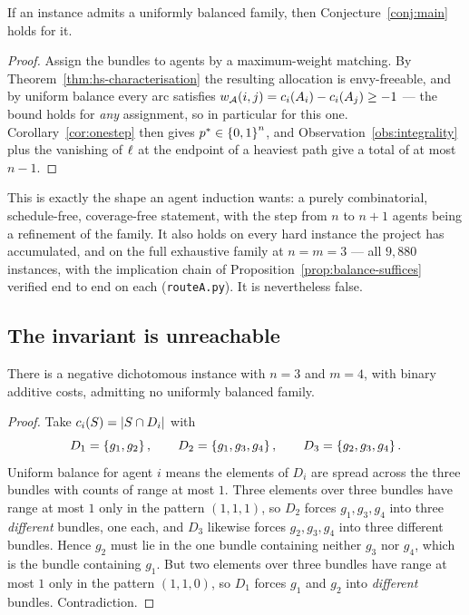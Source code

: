 \begin{proposition}
\label{prop:balance-suffices}
If an instance admits a uniformly balanced family, then
Conjecture~\ref{conj:main} holds for it.
\end{proposition}

\begin{proof}
Assign the bundles to agents by a maximum-weight matching. By
Theorem~\ref{thm:hs-characterisation} the resulting allocation is
envy-freeable, and by uniform balance every arc satisfies
$w_{\mathcal{A}}(i,j) = c_i(A_{i}) - c_i(A_{j}) \ge -1$
--- the bound holds for \emph{any} assignment, so in particular for this one.
Corollary~\ref{cor:onestep} then gives $p^{*} \in \left\{0,1\right\}^n$, and
Observation~\ref{obs:integrality} plus the vanishing of $\ell_{}$ at the
endpoint of a heaviest path give a total of at most $n-1$.
\end{proof}

This is exactly the shape an agent induction wants: a purely combinatorial,
schedule-free, coverage-free statement, with the step from $n$ to $n+1$ agents
being a refinement of the family. It also holds on every hard instance the
project has accumulated, and on the full exhaustive family at $n = m = 3$ ---
all $9{,}880$ instances, with the implication chain of
Proposition~\ref{prop:balance-suffices} verified end to end on each
(\texttt{routeA.py}). It is nevertheless false.

\subsection{The invariant is unreachable}

\begin{proposition}
\label{prop:no-balance}
There is a negative dichotomous instance with $n = 3$ and $m = 4$, with binary
additive costs, admitting no uniformly balanced family.
\end{proposition}

\begin{proof}
Take $c_i(S) = \left\lvert S \cap D_i\right\rvert$ with
\[
  D_1 = \left\{g_1,g_2\right\}, \qquad D_2 = \left\{g_1,g_3,g_4\right\}, \qquad
  D_3 = \left\{g_2,g_3,g_4\right\}.
\]
Uniform balance for agent $i$ means the elements of $D_i$ are spread across the
three bundles with counts of range at most $1$. Three elements over three
bundles have range at most $1$ only in the pattern $(1,1,1)$, so $D_2$ forces
$g_1,g_3,g_4$ into three \emph{different} bundles, one each, and $D_3$ likewise
forces $g_2,g_3,g_4$ into three different bundles. Hence $g_2$ must lie in the
one bundle containing neither $g_3$ nor $g_4$, which is the bundle containing
$g_1$. But two elements over three bundles have range at most $1$ only in the
pattern $(1,1,0)$, so $D_1$ forces $g_1$ and $g_2$ into \emph{different}
bundles. Contradiction.
\end{proof}

